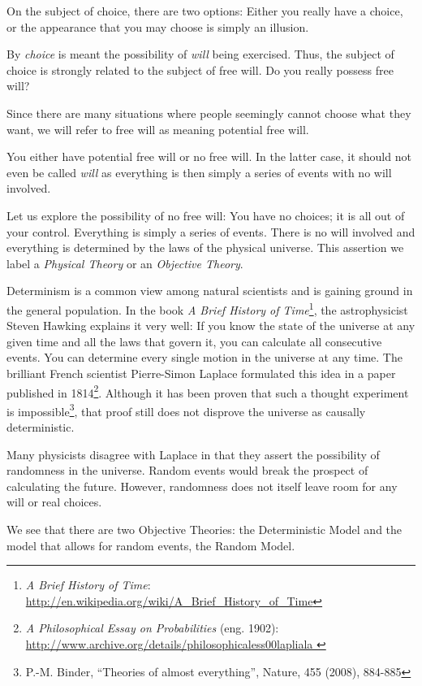 \documentclass[11pt]{article}
\begin{document}
On the subject of choice, there are two options: Either you really have a
choice, or the appearance that you may choose is simply an illusion.

By {\em choice} is meant the possibility of {\em will} being exercised.
Thus, the subject of choice is strongly related to the subject of free will. Do
you really possess free will?

Since there are many situations where people seemingly cannot choose what they
want, we will refer to free will as meaning potential free will.

You either have potential free will or no free will. In the latter case, it
should not even be called {\em will} as everything is then simply a series of events
with no will involved.

Let us explore the possibility of no free will: You have no choices; it is all
out of your control. Everything is simply a series of events. There is no will
involved and everything is determined by the laws of the physical universe. This
assertion we label a {\em Physical Theory} or an {\em Objective Theory}.

Determinism is a common view among natural scientists and is gaining ground in the
general population. In the book {\em A Brief History of Time}\footnote{{ \em A
Brief History of Time}:
\url{http://en.wikipedia.org/wiki/A\_Brief\_History\_of\_Time}}, the
astrophysicist Steven Hawking explains it very well: If you know the state of
the universe at any given time and all the laws that govern it, you can
calculate all consecutive events. You can determine every single motion in the
universe at any time. The brilliant French scientist Pierre-Simon Laplace
formulated this idea in a paper published in 1814\footnote{{ \em A Philosophical
Essay on Probabilities} (eng. 1902):
\url{http://www.archive.org/details/philosophicaless00lapliala }}. Although it
has been proven that such a thought experiment is impossible\footnote{ P.-M.
Binder, ``Theories of almost everything'', Nature, 455 (2008), 884-885}, that
proof still does not disprove the universe as causally deterministic.

Many physicists disagree with Laplace in that they assert the possibility of
randomness in the universe. Random events would break the prospect of
calculating the future. However, randomness does not itself leave room for any
will or real choices.

We see that there are two Objective Theories: the Deterministic Model and
the model that allows for random events, the Random Model.
\end{document}
